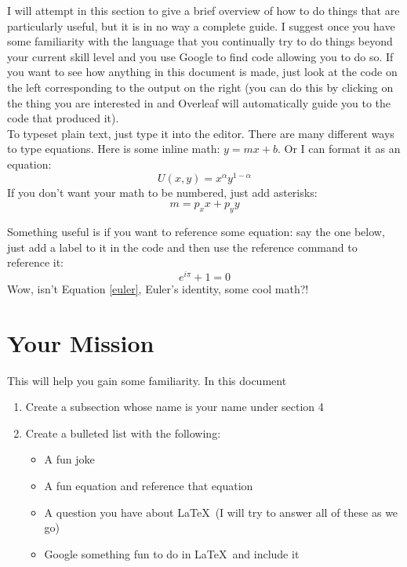 \documentclass{article}
\begin{document}
	I will attempt in this section to give a brief overview of how to do things that are particularly useful, but it is in no way a complete guide. I suggest once you have some familiarity with the language that you continually try to do things beyond your current skill level and you use Google to find code allowing you to do so. If you want to see how anything in this document is made, just look at the code on the left corresponding to the output on the right (you can do this by clicking on the thing you are interested in and Overleaf will automatically guide you to the code that produced it).\\
	
	To typeset plain text, just type it into the editor. There are many different ways to type equations. Here is some inline math: $y = mx + b$. Or I can format it as an equation:
	\begin{equation}
	U(x,y) = x^\alpha y^{1-\alpha}
	\end{equation}
	If you don't want your math to be numbered, just add asterisks: 
	\begin{equation*}
	m = p_x x + p_y y
	\end{equation*}
	
	Something useful is if you want to reference some equation: say the one below, just add a label to it in the code and then use the reference command to reference it:
	\begin{equation} \label{euler}
	e^{i\pi} + 1 = 0
	\end{equation}
	Wow, isn't Equation \ref{euler}, Euler's identity, some cool math?!
	
	\section{Your Mission}
	
	This will help you gain some familiarity. In this document
	\begin{enumerate}
		\item Create a subsection whose name is your name under section 4
		\item Create a bulleted list with the following:
		\begin{itemize}
			\item A fun joke
			\item A fun equation and reference that equation
			\item A question you have about \LaTeX \ (I will try to answer all of these as we go)
			\item Google something fun to do in \LaTeX \ and include it
		\end{itemize}
	\end{enumerate}
	
\end{document}
